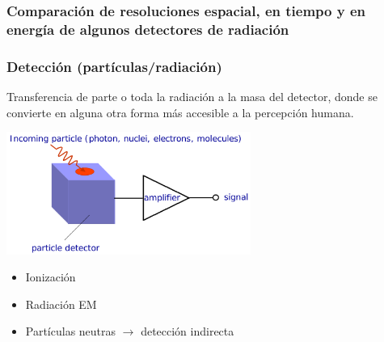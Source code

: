 \documentclass{beamer}
\begin{document}
\begin{frame}
				\frametitle{Comparación de resoluciones espacial, en tiempo y en energía
				de algunos detectores de radiación}
								\begin{center}
								\end{center}
\end{frame} 

\begin{frame}
				\frametitle{Detección (partículas/radiación)}
				Transferencia de parte o toda la radiación a la masa del detector, donde se convierte en alguna otra forma más accesible a la percepción humana.
								\begin{center}
												\includegraphics[height=0.4\textheight,width=0.6\textwidth]{deteccion_principio}
								\end{center}
								\begin{itemize}
												\item Ionización
												\item Radiación EM
												\item Partículas neutras $\to$ detección indirecta 
								\end{itemize}
\end{frame}
\end{document}
